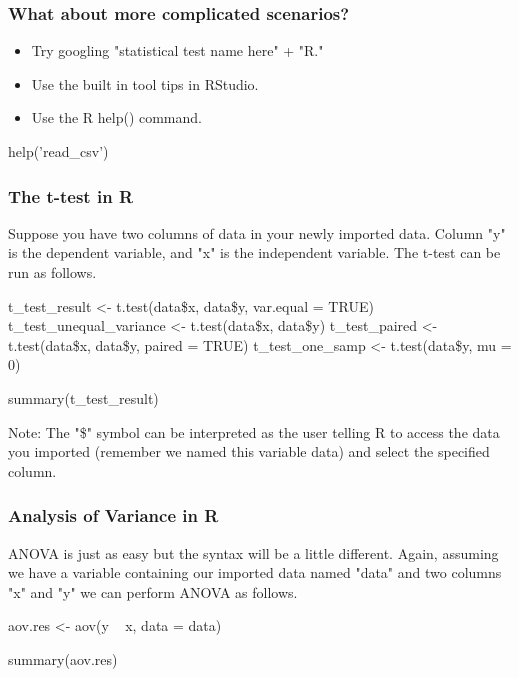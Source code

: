 \documentclass[aspectratio=169]{beamer}
\begin{document}
	\begin{frame}[fragile]
		\frametitle{What about more complicated scenarios?}
		
		\begin{itemize}
			\item Try googling "statistical test name here" + "R."
			\item Use the built in tool tips in RStudio.
			\item Use the R help() command.
		\end{itemize}
	
		\begin{semiverbatim}
        help('read_csv')
		\end{semiverbatim}
	
	\end{frame}

	\begin{frame}[fragile]
		\frametitle{The t-test in R}
		
		Suppose you have two columns of data in your newly imported data.
		Column "y" is the dependent variable, and "x" is the independent variable. The t-test can be run as follows.
		
		\begin{semiverbatim}
        t_test_result <- t.test(data\$x, data\$y, var.equal = TRUE)
        t_test_unequal_variance <- t.test(data\$x, data\$y)
        t_test_paired <- t.test(data\$x, data\$y, paired = TRUE)
        t_test_one_samp <- t.test(data\$y, mu = 0)
            
        summary(t_test_result)
		\end{semiverbatim}
	
	Note: The "\$" symbol can be interpreted as the user telling R to access the data you imported (remember we named this variable data) and select the specified column.
	
	\end{frame}

	\begin{frame}[fragile]
		\frametitle{Analysis of Variance in R}
		
		ANOVA is just as easy but the syntax will be a little different. Again, assuming we have a variable containing our imported data named "data" and two columns "x" and "y" we can perform ANOVA as follows. 
		
		\begin{semiverbatim}
        aov.res <- aov(y ~ x, data = data)
			
        summary(aov.res)
		\end{semiverbatim}
		
	\end{frame}
\end{document}
